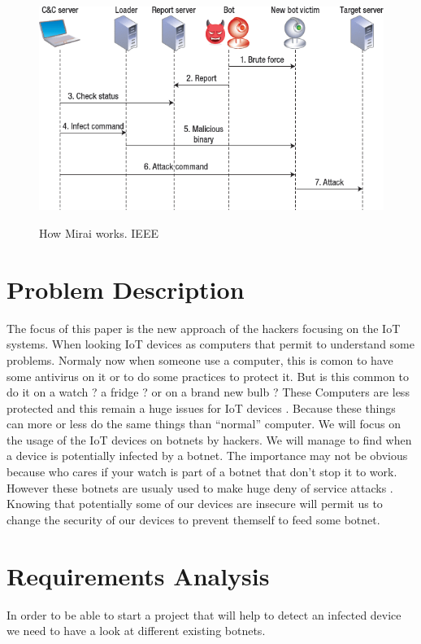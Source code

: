 \documentclass{report}
\begin{document}
\begin{figure}[h]
 \caption{How Mirai works. IEEE \protect\footnotemark}
 \centering
 \includegraphics[width=1.2\textwidth]{./img/botnet-fonct}
 \label{fig:botnet-fonct}
\end{figure}

\chapter{Problem Description}
The focus of this paper is the new approach of the hackers focusing on the IoT systems. When looking IoT devices as computers that permit to understand some problems. Normaly now when someone use a computer, this is comon to have some antivirus on it or to do some practices to protect it. But is this common to do it on a watch ? a fridge ? or on a brand new bulb ? These Computers are less protected and this remain a huge issues for IoT devices \autocite{yang2017survey}. Because these things can more or less do the same things than ``normal'' computer. We will focus on the usage of the IoT devices on botnets by hackers. We will manage to find when a device is potentially infected by a botnet. The importance may not be obvious because who cares if your watch is part of a botnet that don't stop it to work. However these botnets are usualy used to make huge deny of service attacks \autocite{hallman2017ioddos}. Knowing that potentially some of our devices are insecure will permit us to change the security of our devices to prevent themself to feed some botnet.\newline

\chapter{Requirements Analysis}
In order to be able to start a project that will help to detect an infected device we need to have a look at different existing botnets.
\end{document}
